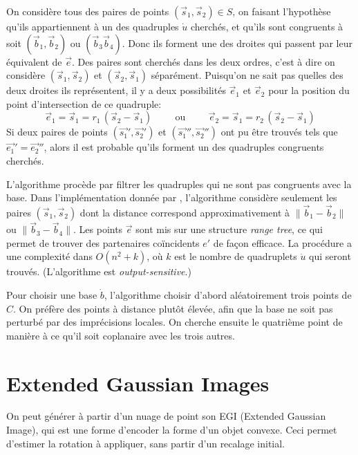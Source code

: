 \documentclass[a4paper,10pt]{scrreprt}
\begin{document}
On considère tous des paires de points $(\vec{s}_1, \vec{s}_2) \in S$, on faisant l'hypothèse qu'ils appartiennent à un des quadruples $\dot{u}$ cherchés, et qu'ils sont congruents à soit $(\vec{b}_1, \vec{b}_2)$ ou $(\vec{b}_3 \vec{b}_4)$. Donc ils forment une des droites qui passent par leur équivalent de $\vec{e}$. Des paires sont cherchés dans les deux ordres, c'est à dire on considère $(\vec{s}_1, \vec{s}_2)$ et $(\vec{s}_2, \vec{s}_1)$ séparément. Puisqu'on ne sait pas quelles des deux droites ils représentent, il y a deux possibilités $\vec{e}_1$ et $\vec{e}_2$ pour la position du point d'intersection de ce quadruple:
\begin{equation}
	\vec{e}_1 = \vec{s}_1 = r_1 \, (\vec{s}_2 - \vec{s}_1)
	\hspace{1cm} \text{ou} \hspace{1cm}
	\vec{e}_2 = \vec{s}_1 = r_2 \, (\vec{s}_2 - \vec{s}_1)	
\end{equation}
Si deux paires de points $(\vec{s_1}', \vec{s_2}')$ et $(\vec{s_1}'', \vec{s_2}'')$ ont pu être trouvés tels que $\vec{e_1}' = \vec{e_2}''$, alors il est probable qu'ils forment un des quadruples congruents cherchés.

L'algorithme procède par filtrer les quadruples qui ne sont pas congruents avec la base. Dans l'implémentation donnée par \cite{Aige2008}, l'algorithme considère seulement les paires $(\vec{s}_1, \vec{s}_2)$ dont la distance correspond approximativement à $\| \vec{b}_1 - \vec{b}_2 \|$ ou $\| \vec{b}_3 - \vec{b}_4 \|$. Les points $\vec{e}$ sont mis sur une structure \emph{range tree}, ce qui permet de trouver des partenaires coïncidents $e'$ de façon efficace. La procédure a une complexité dans $O(n^2 + k)$, où $k$ est le nombre de quadruplets $\dot{u}$ qui seront trouvés. (L'algorithme est \emph{output-sensitive}.)

Pour choisir une base $\dot{b}$, l'algorithme choisir d'abord aléatoirement trois points de $C$. On préfère des points à distance plutôt élevée, afin que la base ne soit pas perturbé par des imprécisions locales. On cherche ensuite le quatrième point de manière à ce qu'il soit coplanaire avec les trois autres.



\section{Extended Gaussian Images}
On peut générer à partir d'un nuage de point son EGI (Extended Gaussian Image), qui est une forme d'encoder la forme d'un objet convexe. Ceci permet d'estimer la rotation à appliquer, sans partir d'un recalage initial.
\end{document}

